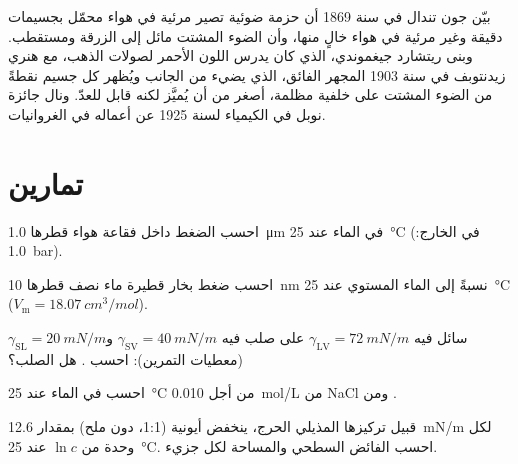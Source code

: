 \begin{history}
بيّن جون تندال في سنة 1869 أن حزمة ضوئية تصير مرئية في هواء محمّل
بجسيمات دقيقة وغير مرئية في هواء خالٍ منها، وأن الضوء المشتت
مائل إلى الزرقة ومستقطب. وبنى ريتشارد جيغموندي، الذي كان يدرس اللون الأحمر لصولات
الذهب، مع هنري زيدنتوبف في سنة 1903 المجهر الفائق، الذي يضيء
 من الجانب ويُظهر كل جسيم نقطةً من الضوء المشتت
على خلفية مظلمة، أصغر من أن يُميَّز لكنه قابل للعدّ. ونال
جائزة نوبل في الكيمياء لسنة 1925 عن أعماله في الغروانيات.
\end{history}

\section{تمارين}

\begin{exercise}[$\star$]\label{exo:b3:colloids:1}
احسب الضغط داخل فقاعة هواء قطرها \qty{1.0}{\micro m} في الماء عند
\qty{25}{\celsius} (في الخارج: \qty{1.0}{bar}).
\end{exercise}

\begin{exercise}[$\star$]\label{exo:b3:colloids:2}
احسب ضغط بخار قطيرة ماء نصف قطرها \qty{10}{nm} نسبةً إلى
الماء المستوي عند \qty{25}{\celsius} ($V_{\mathrm m} = \qty{18.07}{cm^3/mol}$).
\end{exercise}

\begin{exercise}[$\star$]\label{exo:b3:colloids:3}
سائل فيه $\gamma_{\mathrm{LV}} = \qty{72}{mN/m}$ على صلب فيه $\gamma_{\mathrm{SV}} = \qty{40}{mN/m}$ و$\gamma_{\mathrm{SL}} =
\qty{20}{mN/m}$ (معطيات التمرين): احسب . هل  الصلب؟
\end{exercise}

\begin{exercise}[$\star$]\label{exo:b3:colloids:4}
احسب  في الماء عند \qty{25}{\celsius} من أجل \qty{0.010}{mol/L} من NaCl ومن
.
\end{exercise}

\begin{exercise}[$\star\star$]\label{exo:b3:colloids:5}
قبيل تركيزها المذيلي الحرج، ينخفض   أيونية (1:1، دون ملح)
بمقدار \qty{12.6}{mN/m} لكل وحدة من $\ln c$ عند \qty{25}{\celsius}. احسب الفائض السطحي 
والمساحة لكل جزيء.
\end{exercise}

